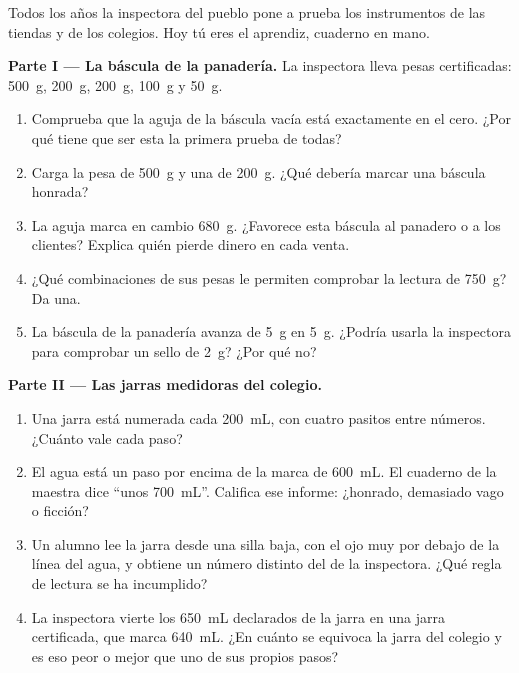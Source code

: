 \begin{problem}\label{pb:g6:measurement-in-science:1}
Todos los años la inspectora del pueblo pone a prueba los instrumentos
de las tiendas y de los colegios. Hoy tú eres el aprendiz, cuaderno en
mano.

\medskip\noindent\textbf{Parte I --- La báscula de la panadería.}
La inspectora lleva pesas certificadas: \qty{500}{g}, \qty{200}{g},
\qty{200}{g}, \qty{100}{g} y \qty{50}{g}.
\begin{enumerate}
  \item Comprueba que la aguja de la báscula vacía está exactamente
        en el cero. ¿Por qué tiene que ser esta la primera prueba de
        todas?
  \item Carga la pesa de \qty{500}{g} y una de \qty{200}{g}. ¿Qué
        debería marcar una báscula honrada?
  \item La aguja marca en cambio \qty{680}{g}. ¿Favorece esta báscula
        al panadero o a los clientes? Explica quién pierde dinero en
        cada venta.
  \item ¿Qué combinaciones de sus pesas le permiten comprobar la
        lectura de \qty{750}{g}? Da una.
  \item La báscula de la panadería avanza de \qty{5}{g} en
        \qty{5}{g}. ¿Podría usarla la inspectora para comprobar un
        sello de \qty{2}{g}? ¿Por qué no?
\end{enumerate}

\medskip\noindent\textbf{Parte II --- Las jarras medidoras del
colegio.}
\begin{enumerate}[resume]
  \item Una jarra está numerada cada \qty{200}{mL}, con cuatro
        pasitos entre números. ¿Cuánto vale cada paso?
  \item El agua está un paso por encima de la marca de
        \qty{600}{mL}. El cuaderno de la maestra dice ``unos
        \qty{700}{mL}''. Califica ese informe: ¿honrado, demasiado
        vago o ficción?
  \item Un alumno lee la jarra desde una silla baja, con el ojo muy
        por debajo de la línea del agua, y obtiene un número distinto
        del de la inspectora. ¿Qué regla de lectura se ha incumplido?
  \item La inspectora vierte los \qty{650}{mL} declarados de la jarra
        en una jarra certificada, que marca \qty{640}{mL}. ¿En cuánto
        se equivoca la jarra del colegio y es eso peor o mejor que
        uno de sus propios pasos?
\end{enumerate}


\end{problem}
